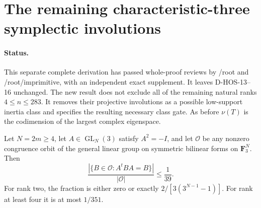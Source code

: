 \section{The remaining characteristic-three symplectic involutions}
\label{sec:symplectic-three-involutions}

\paragraph{Status.}
This separate complete derivation has passed whole-proof reviews by
/root and /root/imprimitive, with an independent exact supplement. It leaves D-HOS-13--16 unchanged. The new result
does not exclude all of the remaining natural ranks $4\le n\le283$.
It removes their projective involutions as a possible low-support
inertia class and specifies the resulting necessary class gate.
As before $\nu(T)$ is the codimension of the largest complex eigenspace.

\begin{lemma}
\label{D-HOS-17}
Let $N=2m\ge4$, let $A\in\operatorname{GL}_{N}(3)$ satisfy
$A^2=-I$, and let $\mathcal O$ be any nonzero congruence orbit of
the general linear group on symmetric bilinear forms on
$\mathbf F_3^N$. Then
\[
 \frac{|\{B\in\mathcal O:A^tBA=B\}|}{|\mathcal O|}\le\frac1{39}.
 \tag{HOS3I.1}
\]
For rank two, the fraction is either zero or exactly
$2/[3(3^{N-1}-1)]$. For rank at least four it is at most $1/351$.
\end{lemma}

